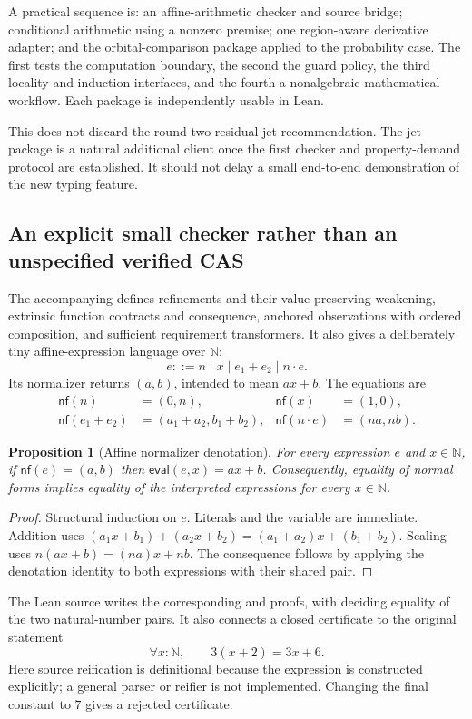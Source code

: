 \documentclass[11pt,a4paper]{article}
\newcommand{\code}[1]{\texttt{\detokenize{#1}}}
\newcommand{\N}{\mathbb N}
\newtheorem{proposition}[theorem]{Proposition}
\theoremstyle{definition}
\begin{document}
A practical sequence is: an affine-arithmetic checker and source bridge;
conditional arithmetic using a nonzero premise; one region-aware derivative
adapter; and the orbital-comparison package applied to the probability case.
The first tests the computation boundary, the second the guard policy, the
third locality and induction interfaces, and the fourth a nonalgebraic
mathematical workflow. Each package is independently usable in Lean.

This does not discard the round-two residual-jet recommendation. The jet package
is a natural additional client once the first checker and property-demand
protocol are established. It should not delay a small end-to-end demonstration
of the new typing feature.

\subsection{An explicit small checker rather than an unspecified verified CAS}
The accompanying \code{SchistCore.lean} defines refinements and their
value-preserving weakening, extrinsic function contracts and consequence,
anchored observations with ordered composition, and sufficient requirement
transformers. It also gives a deliberately tiny affine-expression language over
$\N$:
\[
 e ::= n\mid x\mid e_1+e_2\mid n\cdot e.
\]
Its normalizer returns $(a,b)$, intended to mean $ax+b$. The equations are
\begin{align*}
 \mathsf{nf}(n)&=(0,n), &\mathsf{nf}(x)&=(1,0),\\
 \mathsf{nf}(e_1+e_2)&=(a_1+a_2,b_1+b_2),
 &\mathsf{nf}(n\cdot e)&=(na,nb).
\end{align*}

\begin{proposition}[Affine normalizer denotation]
For every expression $e$ and $x\in\N$, if $\mathsf{nf}(e)=(a,b)$ then
$\mathsf{eval}(e,x)=ax+b$. Consequently, equality of normal forms implies
equality of the interpreted expressions for every $x\in\N$.
\end{proposition}
\begin{proof}
Structural induction on $e$. Literals and the variable are immediate. Addition
uses $(a_1x+b_1)+(a_2x+b_2)=(a_1+a_2)x+(b_1+b_2)$. Scaling uses
$n(ax+b)=(na)x+nb$. The consequence follows by applying the denotation identity
to both expressions with their shared pair.
\end{proof}

The Lean source writes the corresponding \code{eval_nf} and
\code{check_sound} proofs, with \code{check} deciding equality of the two
natural-number pairs. It also connects a closed certificate to the original
statement
\[
 \forall x:\N,\qquad 3(x+2)=3x+6.
\]
Here source reification is definitional because the expression is constructed
explicitly; a general parser or reifier is not implemented. Changing the final
constant to $7$ gives a rejected certificate.
\end{document}
